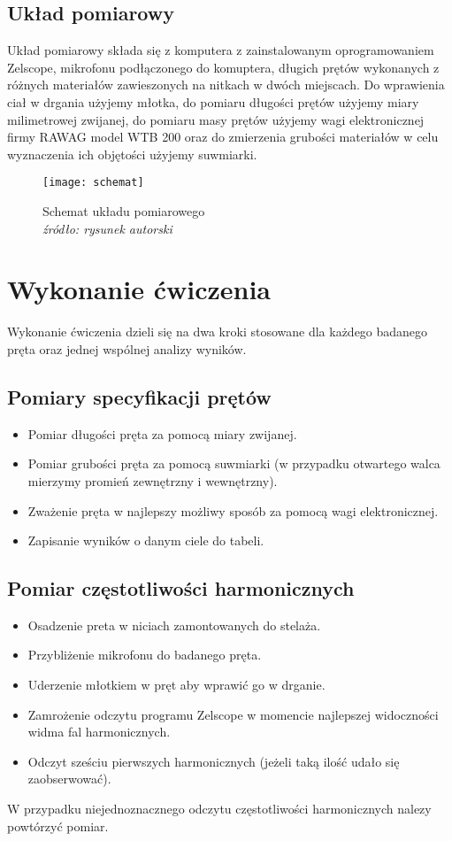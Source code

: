 \documentclass[a4paper,12pts]{article}
\begin{document}
\subsection{Układ pomiarowy}
Układ pomiarowy składa się z komputera z zainstalowanym oprogramowaniem Zelscope, mikrofonu podłączonego do komuptera, długich prętów wykonanych z różnych materiałów zawieszonych na nitkach w dwóch miejscach. Do wprawienia ciał w drgania użyjemy młotka, do pomiaru długości prętów użyjemy miary milimetrowej zwijanej, do pomiaru masy prętów użyjemy wagi elektronicznej firmy RAWAG model WTB 200 oraz do zmierzenia grubości materiałów w celu wyznaczenia ich objętości użyjemy suwmiarki.

\begin{figure}[!h]
	\centering
	\texttt{[image: schemat]}
	\caption{Schemat układu pomiarowego \\ \textit{źródło: rysunek autorski} }
	\label{schematUkladu}
\end{figure}


\newpage \section{Wykonanie ćwiczenia}
Wykonanie ćwiczenia dzieli się na dwa kroki stosowane dla każdego badanego pręta oraz jednej wspólnej analizy wyników.
\subsection{Pomiary specyfikacji prętów}
\begin{itemize}
	\item Pomiar długości pręta za pomocą miary zwijanej.
	\item Pomiar grubości pręta za pomocą suwmiarki (w przypadku otwartego walca mierzymy promień zewnętrzny i wewnętrzny).
	\item Zważenie pręta w najlepszy możliwy sposób za pomocą wagi elektronicznej.
	\item Zapisanie wyników o danym ciele do tabeli.
\end{itemize}

\subsection{Pomiar częstotliwości harmonicznych}
\begin{itemize}
	\item Osadzenie preta w niciach zamontowanych do stelaża.
	\item Przybliżenie mikrofonu do badanego pręta.
	\item Uderzenie młotkiem w pręt aby wprawić go w drganie.
	\item Zamrożenie odczytu programu Zelscope w momencie najlepszej widoczności widma fal harmonicznych.
	\item Odczyt sześciu pierwszych harmonicznych (jeżeli taką ilość udało się zaobserwować).
\end{itemize}
W przypadku niejednoznacznego odczytu częstotliwości harmonicznych nalezy powtórzyć pomiar.
\end{document}
